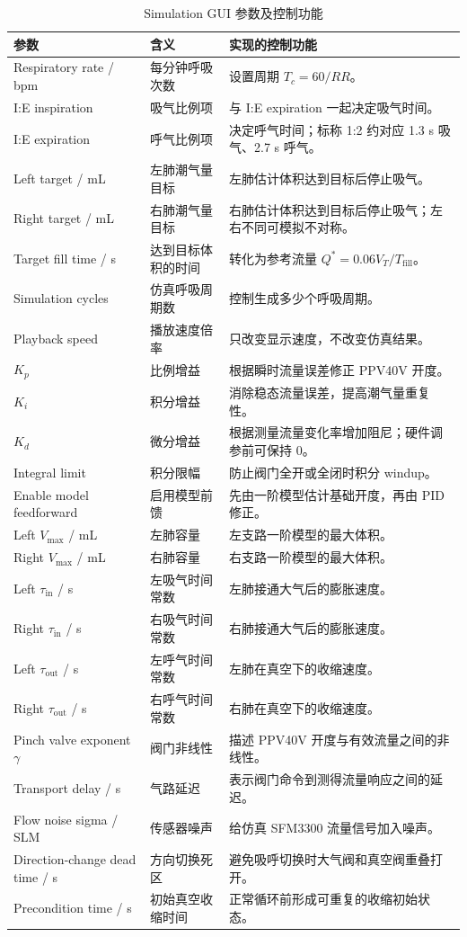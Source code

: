 \documentclass[UTF8,11pt,a4paper]{ctexart}
\renewcommand{\arraystretch}{1.18}
\begin{document}
\begin{table}[H]
\centering
\caption{Simulation GUI 参数及控制功能}
\label{tab:gui-parameters}
\scriptsize
\setlength{\tabcolsep}{4pt}
\renewcommand{\arraystretch}{1.12}
\begin{tabularx}{0.96\textwidth}{p{3.2cm} p{3.0cm} X}
\toprule
\textbf{参数} & \textbf{含义} & \textbf{实现的控制功能} \\
\midrule
Respiratory rate / bpm & 每分钟呼吸次数 & 设置周期 $T_c=60/RR$。 \\
I:E inspiration & 吸气比例项 & 与 I:E expiration 一起决定吸气时间。 \\
I:E expiration & 呼气比例项 & 决定呼气时间；标称 1:2 约对应 1.3 s 吸气、2.7 s 呼气。 \\
Left target / mL & 左肺潮气量目标 & 左肺估计体积达到目标后停止吸气。 \\
Right target / mL & 右肺潮气量目标 & 右肺估计体积达到目标后停止吸气；左右不同可模拟不对称。 \\
Target fill time / s & 达到目标体积的时间 & 转化为参考流量 $Q^*=0.06V_T/T_{\mathrm{fill}}$。 \\
Simulation cycles & 仿真呼吸周期数 & 控制生成多少个呼吸周期。 \\
Playback speed & 播放速度倍率 & 只改变显示速度，不改变仿真结果。 \\
\midrule
$K_p$ & 比例增益 & 根据瞬时流量误差修正 PPV40V 开度。 \\
$K_i$ & 积分增益 & 消除稳态流量误差，提高潮气量重复性。 \\
$K_d$ & 微分增益 & 根据测量流量变化率增加阻尼；硬件调参前可保持 0。 \\
Integral limit & 积分限幅 & 防止阀门全开或全闭时积分 windup。 \\
Enable model feedforward & 启用模型前馈 & 先由一阶模型估计基础开度，再由 PID 修正。 \\
\midrule
Left $V_{\max}$ / mL & 左肺容量 & 左支路一阶模型的最大体积。 \\
Right $V_{\max}$ / mL & 右肺容量 & 右支路一阶模型的最大体积。 \\
Left $\tau_{\mathrm{in}}$ / s & 左吸气时间常数 & 左肺接通大气后的膨胀速度。 \\
Right $\tau_{\mathrm{in}}$ / s & 右吸气时间常数 & 右肺接通大气后的膨胀速度。 \\
Left $\tau_{\mathrm{out}}$ / s & 左呼气时间常数 & 左肺在真空下的收缩速度。 \\
Right $\tau_{\mathrm{out}}$ / s & 右呼气时间常数 & 右肺在真空下的收缩速度。 \\
Pinch valve exponent $\gamma$ & 阀门非线性 & 描述 PPV40V 开度与有效流量之间的非线性。 \\
Transport delay / s & 气路延迟 & 表示阀门命令到测得流量响应之间的延迟。 \\
Flow noise sigma / SLM & 传感器噪声 & 给仿真 SFM3300 流量信号加入噪声。 \\
Direction-change dead time / s & 方向切换死区 & 避免吸呼切换时大气阀和真空阀重叠打开。 \\
Precondition time / s & 初始真空收缩时间 & 正常循环前形成可重复的收缩初始状态。 \\
\bottomrule
\end{tabularx}
\end{table}
\end{document}
